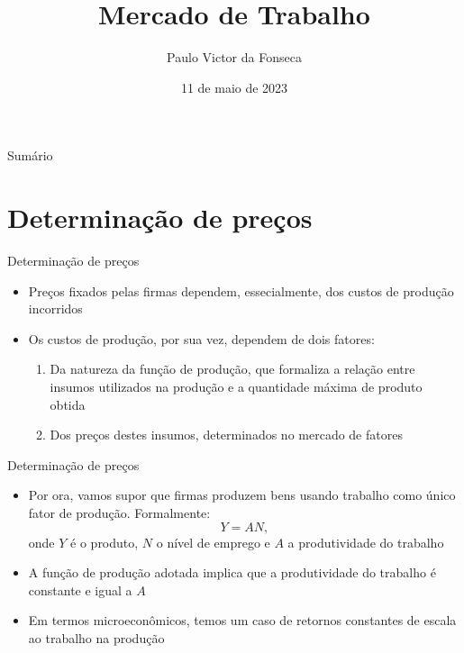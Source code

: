 \documentclass[10pt]{beamer}
\title[]{Mercado de Trabalho}
\author[]{Paulo Victor da Fonseca}
\date{11 de maio de 2023}
\begin{document}
\begin{frame}[plain]
\end{frame}

\begin{frame}{Sumário}
    \tableofcontents
\end{frame}

\section{Determinação de preços}
\begin{frame}
    {Determinação de preços}
    \begin{itemize}
        \item Preços fixados pelas firmas dependem, essecialmente, dos custos de produção incorridos\bigskip
        \item Os custos de produção, por sua vez, dependem de dois fatores:\medskip
        \begin{enumerate}
            \item Da natureza da função de produção, que formaliza a relação entre insumos utilizados na produção e a quantidade máxima de produto obtida\medskip
            \item Dos preços destes insumos, determinados no mercado de fatores
        \end{enumerate}
    \end{itemize}
\end{frame}

\begin{frame}
    {Determinação de preços}
    \begin{itemize}
        \item Por ora, vamos supor que firmas produzem bens usando trabalho como único fator de produção. Formalmente:
        \begin{equation}
            Y = AN,
        \end{equation}
        onde $Y$ é o produto, $N$ o nível de emprego e $A$ a produtividade do trabalho\bigskip
        \item A função de produção adotada implica que a produtividade do trabalho é constante e igual a $A$\bigskip
        \item Em termos microeconômicos, temos um caso de retornos constantes de escala ao trabalho na produção
    \end{itemize}
\end{frame}
\end{document}
